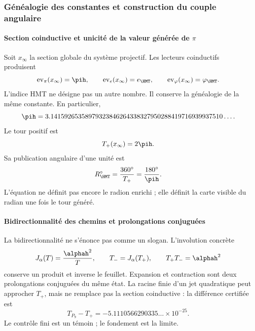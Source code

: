 
\subsubsection{Généalogie des constantes et construction du couple angulaire}

\paragraph{Section coinductive et unicité de la valeur générée de \(\pi\)}

Soit \(x_\infty\) la section globale du système projectif. Les lecteurs
coinductifs produisent
\[
\operatorname{ev}_\pi(x_\infty)=\pih,\qquad
\operatorname{ev}_e(x_\infty)=e_{\HMT},\qquad
\operatorname{ev}_\varphi(x_\infty)=\varphi_{\HMT}.
\]
L'indice HMT ne désigne pas un autre nombre. Il conserve la généalogie de la même
constante. En particulier,
\[
\pih=3.14159265358979323846264338327950288419716939937510\ldots.
\]
Le tour positif est
\begin{equation}
T_+(x_\infty)=2\pih.
\label{eq:vuelta-plus}
\end{equation}
Sa publication angulaire d'une unité est
\begin{equation}
R_{\HMT}^{\circ}=\frac{360^\circ}{T_+}=\frac{180^\circ}{\pih}.
\label{eq:radian-publicado}
\end{equation}
L'équation ne définit pas encore le radion enrichi ; elle définit la carte visible
du radian une fois le tour généré.

\paragraph{Bidirectionnalité des chemins et prolongations conjuguées}

La bidirectionnalité ne s'énonce pas comme un slogan. L'involution concrète
\begin{equation}
J_\alpha(T)=\frac{\alphah^2}{T},\qquad
T_-=J_\alpha(T_+),\qquad T_+T_-=\alphah^2
\label{eq:bidireccional-turn}
\end{equation}
conserve un produit et inverse le feuillet. Expansion et contraction sont deux
prolongations conjuguées du même état. La racine finie d'un jet
quadratique peut approcher \(T_+\), mais ne remplace pas la section
coinductive : la différence certifiée est
\[
T_{P_9}-T_+=-5.1110566290335\ldots\times10^{-25}.
\]
Le contrôle fini est un témoin ; le fondement est la limite.


